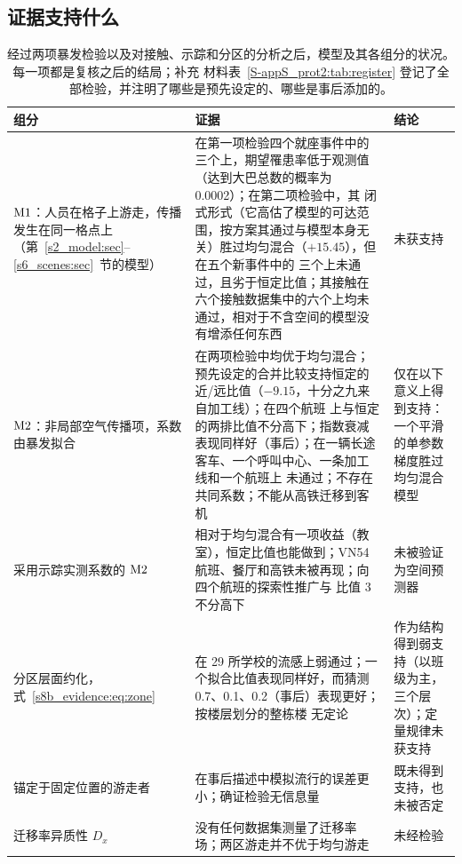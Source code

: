 \subsection{证据支持什么}\label{s8b_evidence:sec:overall}\label{s8_outbreaks:sec:verdict}

\begin{table}[tbp]
  \centering\small
  \caption{经过两项暴发检验以及对接触、示踪和分区的分析之后，模型及其各组分的状况。每一项都是复核之后的结局；补充
  材料表~\ref{S-appS_prot2:tab:register} 登记了全部检验，并注明了哪些是预先设定的、哪些是事后添加的。}
  \label{s8b_evidence:tab:variants}
  \begin{tabular}{@{}>{\raggedright\arraybackslash}p{}>{\raggedright\arraybackslash}p{}>{\raggedright\arraybackslash}p{}@{}}
    \toprule
    组分 & 证据 & 结论 \\
    \midrule
    $\mathrm{M1}$：人员在格子上游走，传播发生在同一格点上（第~\ref{s2_model:sec}--\ref{s6_scenes:sec}~节的模型） &
      在第一项检验四个就座事件中的三个上，期望罹患率低于观测值（达到大巴总数的概率为 0.0002）；在第二项检验中，其
      闭式形式（它高估了模型的可达范围，按方案其通过与模型本身无关）胜过均匀混合（$+15.45$），但在五个新事件中的
      三个上未通过，且劣于恒定比值；其接触在六个接触数据集中的六个上均未通过，相对于不含空间的模型没有增添任何东西 &
      未获支持 \\\addlinespace[2pt]
    $\mathrm{M2}$：非局部空气传播项，系数由暴发拟合 &
      在两项检验中均优于均匀混合；预先设定的合并比较支持恒定的近/远比值（$-9.15$，十分之九来自加工线）；在四个航班
      上与恒定的两排比值不分高下；指数衰减表现同样好（事后）；在一辆长途客车、一个呼叫中心、一条加工线和一个航班上
      未通过；不存在共同系数；不能从高铁迁移到客机 &
      仅在以下意义上得到支持：一个平滑的单参数梯度胜过均匀混合模型 \\\addlinespace[2pt]
    采用示踪实测系数的 $\mathrm{M2}$ &
      相对于均匀混合有一项收益（教室），恒定比值也能做到；VN54 航班、餐厅和高铁未被再现；向四个航班的探索性推广与
      比值 3 不分高下 &
      未被验证为空间预测器 \\\addlinespace[2pt]
    分区层面约化，式~\eqref{s8b_evidence:eq:zone} &
      在 29 所学校的流感上弱通过；一个拟合比值表现同样好，而猜测 0.7、0.1、0.2（事后）表现更好；按楼层划分的整栋楼
      无定论 &
      作为结构得到弱支持（以班级为主，三个层次）；定量规律未获支持 \\\addlinespace[2pt]
    锚定于固定位置的游走者 &
      在事后描述中模拟流行的误差更小；确证检验无信息量 &
      既未得到支持，也未被否定 \\\addlinespace[2pt]
    迁移率异质性 $D_x$ &
      没有任何数据集测量了迁移率场；两区游走并不优于均匀游走 &
      未经检验 \\
    \bottomrule
  \end{tabular}
\end{table}

